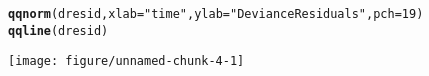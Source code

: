 \documentclass[10pt]{article}\usepackage[]{graphicx}\usepackage[]{xcolor}
\makeatletter
\def\maxwidth{ %
  \ifdim\Gin@nat@width>\linewidth
    \linewidth
  \else
    \Gin@nat@width
  \fi
}
\newcommand{\hlnum}[1]{\textcolor[rgb]{0.686,0.059,0.569}{#1}}%
\newcommand{\hlsng}[1]{\textcolor[rgb]{0.192,0.494,0.8}{#1}}%
\newcommand{\hldef}[1]{\textcolor[rgb]{0.345,0.345,0.345}{#1}}%
\newcommand{\hlkwc}[1]{\textcolor[rgb]{0.333,0.667,0.333}{#1}}%
\newcommand{\hlkwd}[1]{\textcolor[rgb]{0.737,0.353,0.396}{\textbf{#1}}}%
\newenvironment{kframe}{%
 \def\at@end@of@kframe{}%
 \ifinner\ifhmode%
  \def\at@end@of@kframe{\end{minipage}}%
  \begin{minipage}{\columnwidth}%
 \fi\fi%
 \def\FrameCommand##1{\hskip\@totalleftmargin \hskip-\fboxsep
 \colorbox{shadecolor}{##1}\hskip-\fboxsep
     \hskip-\linewidth \hskip-\@totalleftmargin \hskip\columnwidth}%
 \MakeFramed {\advance\hsize-\width
   \@totalleftmargin\z@ \linewidth\hsize
   \@setminipage}}%
 {\par\unskip\endMakeFramed%
 \at@end@of@kframe}
\newenvironment{knitrout}{}{} %
\theoremstyle{definition}
\numberwithin{equation}{subsection}
\numberwithin{figure}{section}
\numberwithin{table}{subsection}
\numberwithin{Report}{section}
\numberwithin{Example}{subsection}
\makeatother
\begin{document}
\begin{knitrout}
\color{fgcolor}\begin{kframe}
\begin{alltt}
\hlkwd{qqnorm}\hldef{(dresid,} \hlkwc{xlab} \hldef{=} \hlsng{"time"}\hldef{,} \hlkwc{ylab} \hldef{=} \hlsng{"Deviance Residuals"}\hldef{,} \hlkwc{pch} \hldef{=} \hlnum{19}\hldef{)}
\hlkwd{qqline}\hldef{(dresid)}
\end{alltt}
\end{kframe}
\texttt{[image: figure/unnamed-chunk-4-1]} 
\end{knitrout}
\end{document}
